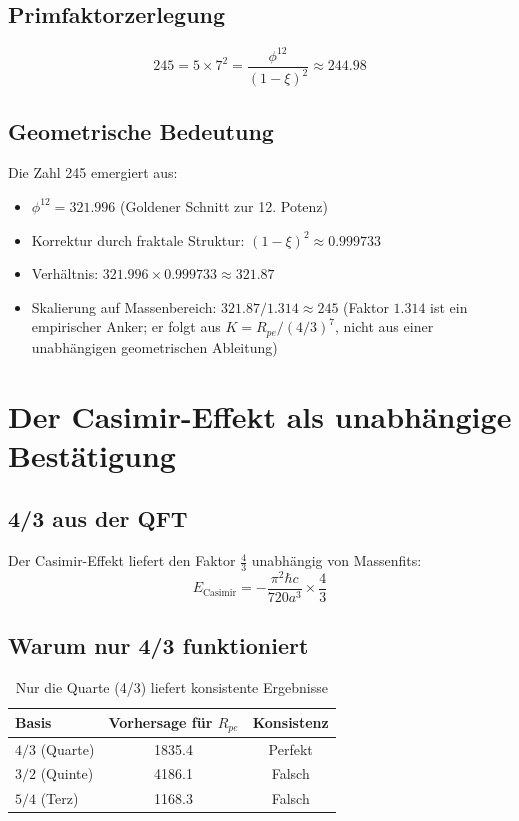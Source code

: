 	\subsection{Primfaktorzerlegung}
	\begin{equation}
		245 = 5 \times 7^2 = \frac{\phi^{12}}{(1 - \xi)^2} \approx 244.98
	\end{equation}
	
	\subsection{Geometrische Bedeutung}
	
	Die Zahl 245 emergiert aus:
	\begin{itemize}
		\item $\phi^{12} = 321.996$ (Goldener Schnitt zur 12. Potenz)
		\item Korrektur durch fraktale Struktur: $(1 - \xi)^2 \approx 0.999733$
		\item Verhältnis: $321.996 \times 0.999733 \approx 321.87$
		\item Skalierung auf Massenbereich: $321.87/1.314 \approx 245$ (Faktor $1.314$ ist ein empirischer Anker; er folgt aus $K = R_{pe}/(4/3)^7$, nicht aus einer unabhängigen geometrischen Ableitung)
	\end{itemize}
	
	\section{Der Casimir-Effekt als unabhängige Bestätigung}
	
	\subsection{4/3 aus der QFT}
	
	Der Casimir-Effekt liefert den Faktor $\frac{4}{3}$ unabhängig von Massenfits:
	\begin{equation}
		E_{\text{Casimir}} = -\frac{\pi^2 \hbar c}{720 a^3} \times \frac{4}{3}
	\end{equation}
	
	\subsection{Warum nur 4/3 funktioniert}
	
	\begin{table}[htbp]
		\centering
		\begin{tabular}{lcc}
			\toprule
			\textbf{Basis} & \textbf{Vorhersage für $R_{pe}$} & \textbf{Konsistenz} \\
			\midrule
			$4/3$ (Quarte) & 1835.4 & \checkmark Perfekt \\
			$3/2$ (Quinte) & 4186.1 & \texttimes Falsch \\
			$5/4$ (Terz) & 1168.3 & \texttimes Falsch \\
			\bottomrule
		\end{tabular}
		\caption{Nur die Quarte (4/3) liefert konsistente Ergebnisse}
	\end{table}
	
